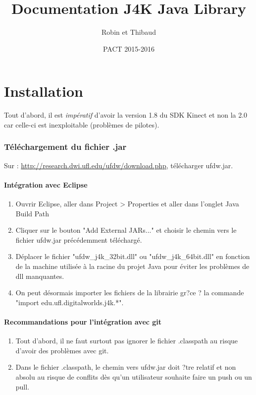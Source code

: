 \documentclass{report}
\title{Documentation J4K Java Library}
\author{Robin \bsc{Shin} et Thibaud \bsc{Lemaire}}
\date{PACT 2015-2016}
\begin{document}
\maketitle
\chapter*{Installation}

Tout d'abord, il est \textit{imp\'eratif} d'avoir la version 1.8 du SDK Kinect et non la 2.0 car celle-ci est inexploitable (probl\`emes de pilotes).

\subsection*{T\'el\'echargement du fichier .jar}
Sur : \underline{http://research.dwi.ufl.edu/ufdw/download.php}, t\'el\'echarger ufdw.jar.

\subsubsection*{Int\'egration avec Eclipse}
\begin{enumerate}
\item Ouvrir Eclipse, aller dans Project > Properties et aller dans l'onglet Java Build Path
\item Cliquer sur le bouton "Add External JARs..." et choisir le chemin vers le fichier ufdw.jar pr\'ec\'edemment t\'el\'echarg\'e.
\item D\'eplacer le fichier "ufdw\_j4k\_32bit.dll" ou "ufdw\_j4k\_64bit.dll" en fonction de la machine utilis\'ee \`a la racine du projet Java pour \'eviter les probl\`emes de dll manquantes.
\item On peut d\'esormais importer les fichiers de la librairie gr?ce ? la commande "import edu.ufl.digitalworlds.j4k.*".
\end{enumerate}

\subsubsection*{Recommandations pour l'int\'egration avec git}
\begin{enumerate}
\item Tout d'abord, il ne faut surtout pas ignorer le fichier .classpath au risque d'avoir des probl\`emes avec git.
\item Dans le fichier .classpath, le chemin vers ufdw.jar doit ?tre relatif et non absolu au risque de conflits d\`es qu'un utilisateur souhaite faire un push ou un pull.
\end{enumerate}
\end{document}
